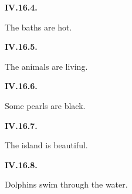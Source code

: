 \par\begin{minipage}{\linewidth}\raggedright
\textbf{IV.16.4.}

The baths are hot.

\end{minipage}\par\addvspace{4pt}

\par\begin{minipage}{\linewidth}\raggedright
\textbf{IV.16.5.}

The animals are living.

\end{minipage}\par\addvspace{4pt}

\par\begin{minipage}{\linewidth}\raggedright
\textbf{IV.16.6.}

Some pearls are black.

\end{minipage}\par\addvspace{4pt}

\par\begin{minipage}{\linewidth}\raggedright
\textbf{IV.16.7.}

The island is beautiful.

\end{minipage}\par\addvspace{4pt}

\par\begin{minipage}{\linewidth}\raggedright
\textbf{IV.16.8.}

Dolphins swim through the water.

\end{minipage}\par\addvspace{4pt}

